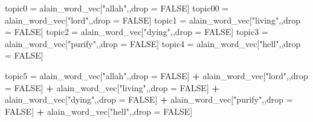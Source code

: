 \documentclass[
]{article}
\newenvironment{Shaded}{\begin{snugshade}}{\end{snugshade}}
\newcommand{\ConstantTok}[1]{\textcolor[rgb]{0.56,0.35,0.01}{#1}}
\newcommand{\NormalTok}[1]{#1}
\newcommand{\OtherTok}[1]{\textcolor[rgb]{0.56,0.35,0.01}{#1}}
\newcommand{\SpecialCharTok}[1]{\textcolor[rgb]{0.81,0.36,0.00}{\textbf{#1}}}
\newcommand{\StringTok}[1]{\textcolor[rgb]{0.31,0.60,0.02}{#1}}
\begin{document}
\begin{Shaded}
\begin{Highlighting}[]
\NormalTok{topic0 }\OtherTok{=}\NormalTok{ alain\_word\_vec[}\StringTok{"allah"}\NormalTok{,,drop }\OtherTok{=} \ConstantTok{FALSE}\NormalTok{] }
\NormalTok{topic00 }\OtherTok{=}\NormalTok{ alain\_word\_vec[}\StringTok{"lord"}\NormalTok{,,drop }\OtherTok{=} \ConstantTok{FALSE}\NormalTok{] }
\NormalTok{topic1 }\OtherTok{=}\NormalTok{ alain\_word\_vec[}\StringTok{"living"}\NormalTok{,,drop }\OtherTok{=} \ConstantTok{FALSE}\NormalTok{] }
\NormalTok{topic2 }\OtherTok{=}\NormalTok{ alain\_word\_vec[}\StringTok{"dying"}\NormalTok{,,drop }\OtherTok{=} \ConstantTok{FALSE}\NormalTok{] }
\NormalTok{topic3 }\OtherTok{=}\NormalTok{ alain\_word\_vec[}\StringTok{"purify"}\NormalTok{,,drop }\OtherTok{=} \ConstantTok{FALSE}\NormalTok{] }
\NormalTok{topic4 }\OtherTok{=}\NormalTok{ alain\_word\_vec[}\StringTok{"hell"}\NormalTok{,,drop }\OtherTok{=} \ConstantTok{FALSE}\NormalTok{] }

\NormalTok{topic5 }\OtherTok{=}\NormalTok{ alain\_word\_vec[}\StringTok{"allah"}\NormalTok{,,drop }\OtherTok{=} \ConstantTok{FALSE}\NormalTok{] }\SpecialCharTok{+} 
\NormalTok{  alain\_word\_vec[}\StringTok{"lord"}\NormalTok{,,drop }\OtherTok{=} \ConstantTok{FALSE}\NormalTok{] }\SpecialCharTok{+}
\NormalTok{  alain\_word\_vec[}\StringTok{"living"}\NormalTok{,,drop }\OtherTok{=} \ConstantTok{FALSE}\NormalTok{] }\SpecialCharTok{+} 
\NormalTok{  alain\_word\_vec[}\StringTok{"dying"}\NormalTok{,,drop }\OtherTok{=} \ConstantTok{FALSE}\NormalTok{] }\SpecialCharTok{+} 
\NormalTok{  alain\_word\_vec[}\StringTok{"purify"}\NormalTok{,,drop }\OtherTok{=} \ConstantTok{FALSE}\NormalTok{] }\SpecialCharTok{+}
\NormalTok{  alain\_word\_vec[}\StringTok{"hell"}\NormalTok{,,drop }\OtherTok{=} \ConstantTok{FALSE}\NormalTok{] }


\end{Highlighting}
\end{Shaded}
\end{document}
